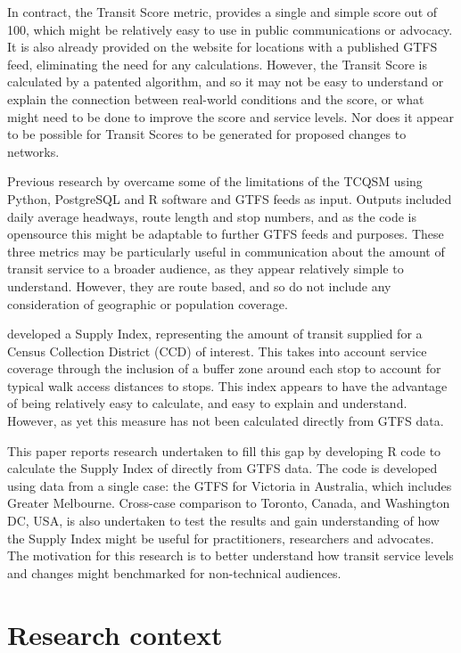 \documentclass[numbered]{trbunofficial}
\begin{document}
In contract, the Transit Score metric, provides a single and simple
score out of 100, which might be relatively easy to use in public
communications or advocacy. It is also already provided on the
\citet{WalkScore:2023tg} website for locations with a published GTFS
feed, eliminating the need for any calculations. However, the Transit
Score is calculated by a patented algorithm, and so it may not be easy
to understand or explain the connection between real-world conditions
and the score, or what might need to be done to improve the score and
service levels. Nor does it appear to be possible for Transit Scores to
be generated for proposed changes to networks.

Previous research by \citet{Wong:2013aa} overcame some of the
limitations of the TCQSM using Python, PostgreSQL and R software and
GTFS feeds as input. Outputs included daily average headways, route
length and stop numbers, and as the code is opensource this might be
adaptable to further GTFS feeds and purposes. These three metrics may be
particularly useful in communication about the amount of transit service
to a broader audience, as they appear relatively simple to understand.
However, they are route based, and so do not include any consideration
of geographic or population coverage.

\citet{currie2007identifying} developed a Supply Index, representing the
amount of transit supplied for a Census Collection District (CCD) of
interest. This takes into account service coverage through the inclusion
of a buffer zone around each stop to account for typical walk access
distances to stops. This index appears to have the advantage of being
relatively easy to calculate, and easy to explain and understand.
However, as yet this measure has not been calculated directly from GTFS
data.

This paper reports research undertaken to fill this gap by developing R
code to calculate the Supply Index of \citet{currie2007identifying}
directly from GTFS data. The code is developed using data from a single
case: the GTFS for Victoria in Australia, which includes Greater
Melbourne. Cross-case comparison to Toronto, Canada, and Washington DC,
USA, is also undertaken to test the results and gain understanding of
how the Supply Index might be useful for practitioners, researchers and
advocates. The motivation for this research is to better understand how
transit service levels and changes might benchmarked for non-technical
audiences.

\hypertarget{research-context}{%
\section{Research context}\label{research-context}}
\end{document}
